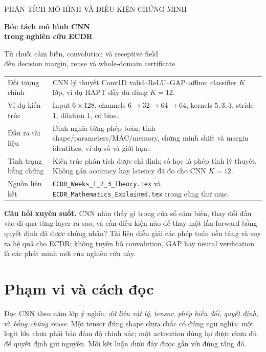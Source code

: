 \documentclass[11pt,a4paper]{article}
\newcommand{\code}[1]{{\small\ttfamily\nolinkurl{#1}}}
\theoremstyle{definition}
\begin{document}
\hypersetup{pageanchor=false}
\begin{titlepage}
\vspace*{1cm}
{\Large\color{teal} PHÂN TÍCH MÔ HÌNH VÀ ĐIỀU KIỆN CHỨNG MINH\par}
\vspace{0.6cm}
{\huge\bfseries\color{ink} Bóc tách mô hình CNN\\trong nghiên cứu ECDR\par}
\vspace{0.7cm}
{\Large Từ chuỗi cảm biến, convolution và receptive field\\
đến decision margin, reuse và whole-domain certificate\par}
\vspace{0.9cm}
\begin{tabularx}{\linewidth}{@{}P{3cm}Y@{}}\toprule
Đối tượng chính & CNN lý thuyết Conv1D valid--ReLU--GAP--affine; classifier
$K$ lớp, ví dụ HAPT đầy đủ dùng $K=12$.\\
Ví dụ kiến trúc & Input $6\times128$, channels $6\to32\to64\to64$,
kernels $5,3,3$, stride 1, dilation 1, có bias.\\
Đầu ra tài liệu & Định nghĩa từng phép toán, tính shape/parameters/MAC/memory,
chứng minh shift và margin identities, ví dụ số và giới hạn.\\
Tình trạng bằng chứng & Kiến trúc phân tích được chỉ định; số học là phép tính
lý thuyết. Không gán accuracy hay latency đã đo cho CNN $K=12$.\\
Nguồn liên kết & \code{ECDR_Weeks_1_2_3_Theory.tex} và
\code{ECDR_Mathematics_Explained.tex} trong cùng thư mục.\\\bottomrule
\end{tabularx}
\vfill
\textbf{Câu hỏi xuyên suốt.} CNN nhìn thấy gì trong cửa sổ cảm biến, thay đổi
đầu vào đi qua từng layer ra sao, và cần điều kiện nào để thay một lần
forward bằng quyết định đã được chứng nhận? Tài liệu diễn giải các phép
toán nền tảng và suy ra hệ quả cho ECDR; không tuyên bố convolution, GAP
hay neural verification là các phát minh mới của nghiên cứu này.
\end{titlepage}
\hypersetup{pageanchor=true}

\section*{Phạm vi và cách đọc}
Đọc CNN theo năm lớp ý nghĩa: \emph{dữ liệu vật lý}, \emph{tensor},
\emph{phép biến đổi}, \emph{quyết định}, và \emph{bằng chứng reuse}.
Một tensor đúng shape chưa chắc có đúng ngữ nghĩa; một logit lớn chưa phải
bảo đảm độ chính xác; một activation dùng lại được chưa đủ để quyết định
giữ nguyên. Mỗi kết luận dưới đây được gắn với đúng tầng đó.
\end{document}
